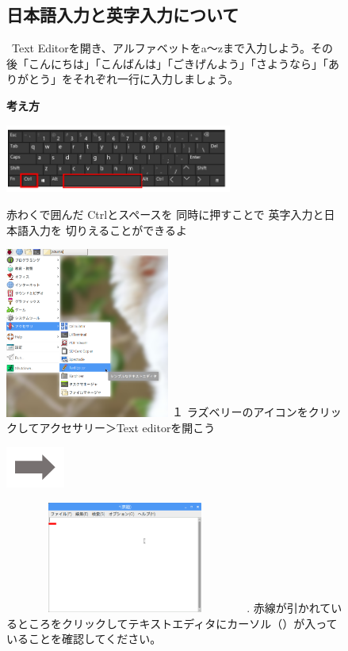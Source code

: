 \documentclass[a4paper,12pt]{jarticle}
\begin{document}
\clearpage
\begin{figure}[ht]
  \subsection{\theExercise 日本語入力と英字入力について}
  \ Text
  Editorを開き、アルファベットをa〜zまで入力しよう。その後「こんにちは」「こんばんは」「ごきげんよう」「さようなら」「ありがとう」をそれぞれ一行に入力しましょう。

  {\bf\large 考え方}


  \centering
  \begin{minipage}{\textwidth}
    \includegraphics[width=7.459cm,height=2.245cm]{textbook-img065.png}
    \raisebox{10mm}
    {
      \begin{minipage}{0.5\textwidth}
        赤わくで囲んだ
        Ctrlとスペースを
        同時に押すことで
        英字入力と日本語入力を
        切りえることができるよ
      \end{minipage}
    }
  \end{minipage}

  \begin{minipage}{6.984cm}
    \includegraphics[width=5.408cm,height=5.595cm]{textbook-img064.png}
    \flushleft
    １
    ラズベリーのアイコンをクリックしてアクセサリー＞Text
    editorを開こう
  \end{minipage}
  \includegraphics[width=1.919cm,height=1.365cm]{textbook-img053.png}
  \begin{minipage}{7.347cm}
    \includegraphics[width=7.897cm,height=3.655cm]{textbook-img063.png}
    .
    赤線が引かれているところをクリックしてテキストエディタにカーソル（）が入っていることを確認してください。
  \end{minipage}


\end{figure}
\end{document}
